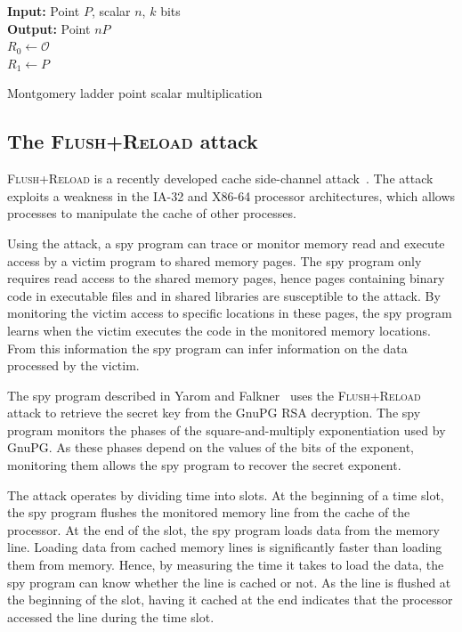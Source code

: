 \documentclass[twocolumn]{svjour3}
\begin{document}
\vspace{-0.5cm}
\begin{algorithm}[htb]\label{mont}
 \SetAlgoLined
{\bf Input:} Point $P$, scalar $n$, $k$ bits\\
{\bf Output:} Point $nP$\\
$R_0\gets \mathcal{O}$\\
$R_1\gets P$\\
 \caption{Montgomery ladder point scalar multiplication}
\end{algorithm}\vspace{-0.5cm}




\newpage

\subsection{The \textsc{Flush+Reload} attack}
\textsc{Flush+Reload} is a recently developed cache side-channel attack~\cite{yarom13flush}.
The attack exploits a weakness in the IA-32 and X86-64 processor architectures, which allows
processes to manipulate the cache of other processes.

Using the attack, a spy program can trace or monitor memory read and execute access by a victim program to shared memory pages.
The spy program only requires read access to the shared memory pages, hence pages containing binary code in executable files and
in shared libraries are susceptible to the attack.
By monitoring the victim access to specific locations in these pages, the spy program learns when the victim
executes the code in the monitored memory locations.
From this information the spy program can infer information on the data processed by the victim.

The spy program described in Yarom and Falkner~\cite{yarom13flush} uses the \textsc{Flush+Reload} attack to retrieve
the secret key from the GnuPG RSA decryption.
The spy program monitors the phases of the square-and-multiply exponentiation used by GnuPG.  
As these phases depend on the values of the bits of the exponent, monitoring them
allows the spy program to recover the secret exponent.

The attack operates by dividing time into slots.  
At the beginning of a time slot, the spy program flushes the monitored memory line from the cache of the processor.
At the end of the slot, the spy program loads data from the memory line.
Loading data from cached memory lines is significantly faster than loading them from memory.
Hence, by measuring the time it takes to load the data, the spy program can know whether the line is cached or not.
As the line is flushed at the beginning of the slot, having it cached at the end indicates that the processor accessed
the line during the time slot.
\end{document}
